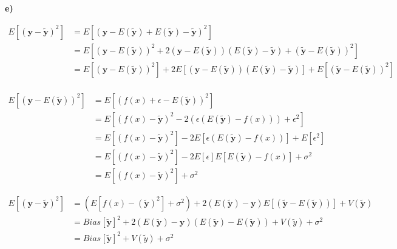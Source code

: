 \documentclass[11pt,a4paper,oldfontcommands]{memoir}
\begin{document}
\textbf{e)}

\begin{align*}
    E\left[(\boldsymbol{y} - \boldsymbol{\tilde y})^2\right] &= E\left[(\boldsymbol{y} - E(\boldsymbol{\tilde y}) + E(\boldsymbol{\tilde y}) - \boldsymbol{\tilde y})^2\right]\\
    &= E\left[(\boldsymbol{y} - E(\boldsymbol{\tilde y}))^2 + 2(\boldsymbol{y} - E(\boldsymbol{\tilde y}))(E(\boldsymbol{\tilde y}) - \boldsymbol{\tilde y}) + (\boldsymbol{\tilde y} - E(\boldsymbol{\tilde y}))^2\right]\\
    &= E\left[(\boldsymbol{y} - E(\boldsymbol{\tilde y}))^2\right] + 2E\left[(\boldsymbol{y} - E(\boldsymbol{\tilde y}))(E(\boldsymbol{\tilde y}) - \boldsymbol{\tilde y})\right] + E\left[(\boldsymbol{\tilde y} - E(\boldsymbol{\tilde y}))^2\right]\\
\end{align*}

\begin{align*}
    E\left[(\boldsymbol{y} - E(\boldsymbol{\tilde y}))^2\right] &= E\left[(f(x) + \epsilon - E(\boldsymbol{\tilde y}))^2\right]\\
    &= E\left[(f(x)-\boldsymbol{\tilde y})^2 - 2(\epsilon(E(\boldsymbol{\tilde y}) - f(x))) + \epsilon^2\right]\\
    &= E\left[(f(x)-\boldsymbol{\tilde y})^2\right] - 2E\left[\epsilon(E(\boldsymbol{\tilde y}) - f(x))\right] + E[\epsilon^2]\\
    &= E\left[(f(x) - \boldsymbol{\tilde y})^2\right] - 2E[\epsilon]E\left[E(\boldsymbol{\tilde y}) - f(x)\right]+ \sigma^2\\
    &= E\left[(f(x)-\boldsymbol{\tilde y})^2\right] + \sigma^2
\end{align*}

\begin{align*}
    E\left[(\boldsymbol{y} - \boldsymbol{\tilde y})^2\right] &= (E\left[f(x)-(\boldsymbol{\tilde y})^2\right] + \sigma^2) + 2(E(\boldsymbol{\tilde y}) - \boldsymbol{y})E\left[(\boldsymbol{\tilde y} - E(\boldsymbol{\tilde y}))\right]+V(\boldsymbol{\tilde y})\\
    &= Bias[\boldsymbol{\tilde y}]^2 + 2(E(\boldsymbol{\tilde y}) - \boldsymbol{y})(E(\boldsymbol{\tilde y}) - E(\boldsymbol{\tilde y})) + V(\tilde y) + \sigma^2\\
    &= Bias[\boldsymbol{\tilde y}]^2 + V(\tilde y) + \sigma^2
\end{align*}
\end{document}
